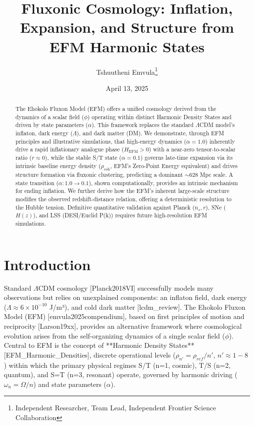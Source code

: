 \documentclass[11pt]{article}
\title{Fluxonic Cosmology: Inflation, Expansion, and Structure from EFM Harmonic States}
\author{Tshuutheni Emvula\thanks{Independent Researcher, Team Lead, Independent Frontier Science Collaboration}}
\date{April 13, 2025}
\begin{document}
\maketitle

\begin{abstract}
The Ehokolo Fluxon Model (EFM) offers a unified cosmology derived from the dynamics of a scalar field (\(\phi\)) operating within distinct Harmonic Density States and driven by state parameters (\(\alpha\)). This framework replaces the standard \(\Lambda\)CDM model's inflaton, dark energy (\(\Lambda\)), and dark matter (DM). We demonstrate, through EFM principles and illustrative simulations, that high-energy dynamics (\(\alpha=1.0\)) inherently drive a rapid inflationary analogue phase (\(H_{\text{EFM}} > 0\)) with a near-zero tensor-to-scalar ratio (\(r \approx 0\)), while the stable S/T state (\(\alpha=0.1\)) governs late-time expansion via its intrinsic baseline energy density (\(\rho_{\text{coh}}\), EFM's Zero-Point Energy equivalent) and drives structure formation via fluxonic clustering, predicting a dominant \(\sim\)628 Mpc scale. A state transition (\(\alpha: 1.0 \to 0.1\)), shown computationally, provides an intrinsic mechanism for ending inflation. We further derive how the EFM's inherent large-scale structure modifies the observed redshift-distance relation, offering a deterministic resolution to the Hubble tension. Definitive quantitative validation against Planck (\(n_s, r\)), SNe (\(H(z)\)), and LSS (DESI/Euclid P(k)) requires future high-resolution EFM simulations.
\end{abstract}

\section{Introduction}
Standard \(\Lambda\)CDM cosmology [Planck2018VI] successfully models many observations but relies on unexplained components: an inflaton field, dark energy (\(\Lambda \approx 6 \times 10^{-10}\) J/m³), and cold dark matter [lcdm\_review]. The Ehokolo Fluxon Model (EFM) [emvula2025compendium], based on first principles of motion and reciprocity [Larson19xx], provides an alternative framework where cosmological evolution arises from the self-organizing dynamics of a single scalar field (\(\phi\)). Central to EFM is the concept of **Harmonic Density States** [EFM\_Harmonic\_Densities], discrete operational levels (\(\rho_{n'} = \rho_{ref}/n'\), \(n' \approx 1-8\)) within which the primary physical regimes S/T (n=1, cosmic), T/S (n=2, quantum), and S=T (n=3, resonant) operate, governed by harmonic driving (\(\omega_n = \Omega/n\)) and state parameters (\(\alpha\)).
\end{document}
